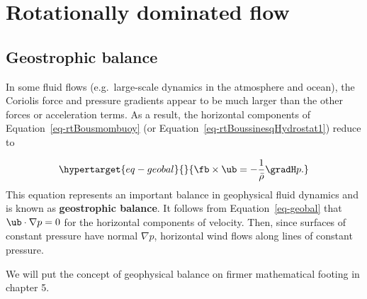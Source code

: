 \documentclass[
  letterpaper,
  twocolumn,
  landscape]{report}
\begin{document}
\hypertarget{rotationally-dominated-flow}{%
\section{Rotationally dominated
flow}\label{rotationally-dominated-flow}}

\hypertarget{sec-geobal}{%
\subsection{Geostrophic balance}\label{sec-geobal}}

In some fluid flows (e.g.~large-scale dynamics in the atmosphere and
ocean), the Coriolis force and pressure gradients appear to be much
larger than the other forces or acceleration terms. As a result, the
horizontal components of Equation~\ref{eq-rtBousmombuoy} (or
Equation~\ref{eq-rtBoussinesqHydrostat1}) reduce to

\begin{equation}\protect\hypertarget{eq-geobal}{}{
\fb\times\ub = -\frac{1}{\bar\rho}\gradH p.
}\label{eq-geobal}\end{equation} This equation represents an important
balance in geophysical fluid dynamics and is known as
\textbf{geostrophic balance}. It follows from Equation~\ref{eq-geobal}
that \(\ub\cdot\nabla p=0\) for the horizontal components of velocity.
Then, since surfaces of constant pressure have normal \(\nabla p\),
horizontal wind flows along lines of constant pressure.

\begin{tcolorbox}[enhanced jigsaw, toprule=.15mm, left=2mm, opacityback=0, breakable, arc=.35mm, colback=white, rightrule=.15mm, bottomrule=.15mm, colframe=quarto-callout-note-color-frame, leftrule=.75mm]
\begin{minipage}[t]{5.5mm}
\textcolor{quarto-callout-note-color}{\faInfo}
\end{minipage}%
\begin{minipage}[t]{\textwidth - 5.5mm}

We will put the concept of geophysical balance on firmer mathematical
footing in chapter 5.

\end{minipage}%
\end{tcolorbox}
\end{document}
